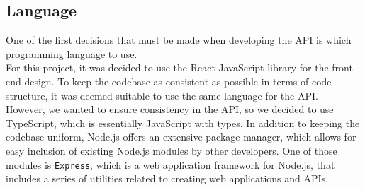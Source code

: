 \subsection{Language}
One of the first decisions that must be made when developing the API is which programming language to use.\\
For this project, it was decided to use the React JavaScript library for the front end design.
To keep the codebase as consistent as possible in terms of code structure, it was deemed suitable to use the same language for the API.\\
However, we wanted to ensure consistency in the API, so we decided to use TypeScript, which is essentially JavaScript with types.
In addition to keeping the codebase uniform, Node.js offers an extensive package manager, which allows for easy inclusion of existing Node.js modules by other developers.
One of those modules is \texttt{Express}, which is a web application framework for Node.js, that includes a series of utilities related to creating web applications and APIs.
